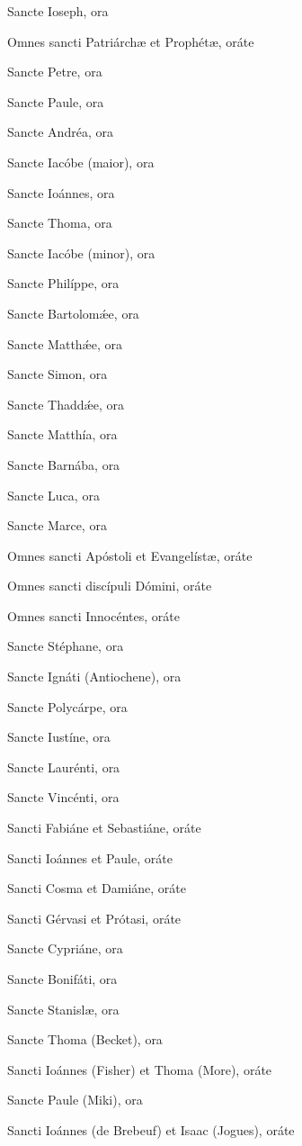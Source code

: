 \documentclass[12pt,a6paper]{book}
\begin{document}
\begin{sloppy}
Sancte Ioseph, ora

Omnes sancti Patriárchæ et Prophétæ, oráte

Sancte Petre, ora

Sancte Paule, ora

Sancte Andréa, ora

Sancte Iacóbe (maior), ora

Sancte Ioánnes, ora

Sancte Thoma, ora

Sancte Iacóbe (minor), ora

Sancte Philíppe, ora

Sancte Bartolomǽe, ora

Sancte Matthǽe, ora

Sancte Simon, ora

Sancte Thaddǽe, ora

Sancte Matthía, ora

Sancte Barnába, ora

Sancte Luca, ora

Sancte Marce, ora

Omnes sancti Apóstoli et Evangelístæ, oráte

Omnes sancti discípuli Dómini, oráte

Omnes sancti Innocéntes, oráte

\vspace{3mm}

Sancte Stéphane, ora

Sancte Ignáti (Antiochene), ora

Sancte Polycárpe, ora

Sancte Iustíne, ora

Sancte Laurénti, ora

Sancte Vincénti, ora

Sancti Fabiáne et Sebastiáne, oráte

Sancti Ioánnes et Paule, oráte

Sancti Cosma et Damiáne, oráte

Sancti Gérvasi et Prótasi, oráte

Sancte Cypriáne, ora

Sancte Bonifáti, ora

Sancte Stanislæ, ora

Sancte Thoma (Becket), ora

Sancti Ioánnes (Fisher) et Thoma (More), oráte

Sancte Paule (Miki), ora

Sancti Ioánnes (de Brebeuf) et Isaac (Jogues), oráte


\end{sloppy}
\end{document}
